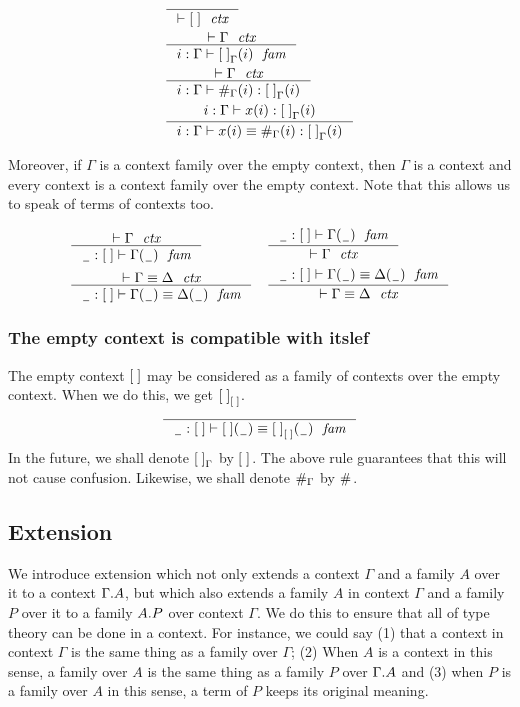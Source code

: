 \begin{align}
& \inference{}{\jctx{\emptyc}}\\
& \inference{\jctx{\Gamma}}{\jvfam{i}{\Gamma}{\emptyf[\Gamma]}}\\
& \inference{\jctx{\Gamma}}{\jvterm{i}{\Gamma}{\emptyf[\Gamma]}{\emptytm[\Gamma]}}\\
& \inference{\jvterm{i}{\Gamma}{\emptyf[\Gamma]}{x}}{\jvtermeq{i}{\Gamma}{\emptyf[\Gamma]}{x}{\emptytm[\Gamma]}}
\end{align}

Moreover, if $\Gamma$ is a context family over the
empty context, then $\Gamma$ is a context and every context is a context
family over the empty context. Note that this allows us to speak
of terms of contexts too.

\begin{align}
& \inference{\jctx{\Gamma}}{\jvfam{\nameless}{\emptyc}{\Gamma}} 
& & \inference{\jvfam{\nameless}{\emptyc}{\Gamma}}{\jctx{\Gamma}}\\
& \inference{\jctxeq{\Gamma}{\Delta}}{\jvfameq{\nameless}{\emptyc}{\Gamma}{\Delta}}
& & \inference{\jvfameq{\nameless}{\emptyc}{\Gamma}{\Delta}}{\jctxeq{\Gamma}{\Delta}}
\end{align}

\subsubsection{The empty context is compatible with itslef}
The empty context $\emptyc$ may be considered as a family of contexts over the empty
context. When we do this, we get $\emptyf[\emptyc]$.
\begin{equation}
\inference{}{\jvfameq{\nameless}{\emptyc}{\emptyc}{\emptyf[\emptyc]}}
\end{equation}
In the future, we shall denote $\emptyf[\Gamma]$ by $\emptyf$. The above rule
guarantees that this will not cause confusion. Likewise, we shall denote
$\emptytm[\Gamma]$ by $\emptytm$.

\subsection{Extension}
We introduce extension which not only extends a context $\Gamma$ and a family
$A$ over it to a context $\ctxext{\Gamma}{A}$, but which also extends a family $A$
in context $\Gamma$ and a family $P$ over it to a family $\ctxext{A}{P}$ over context
$\Gamma$. We do this to ensure that all of type theory can be done in a context.
For instance, we could say (1) that a context in context $\Gamma$ is the same thing
as a family over $\Gamma$; (2) When $A$ is a context in this sense, a family over
$A$ is the same thing as a family $P$ over $\ctxext{\Gamma}{A}$ and 
(3) when $P$ is a family over $A$ in this sense, a term of $P$ keeps its original meaning.

